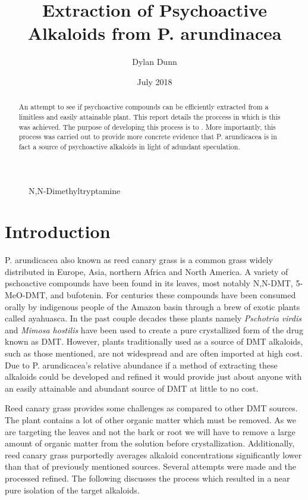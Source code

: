 \documentclass[12pt, a4paper]{article}
\title{Extraction of Psychoactive Alkaloids from P. arundinacea}
\author{Dylan Dunn}
\date{July 2018}
\begin{document}
\maketitle

\begin{abstract}
    An attempt to see if psychoactive compounds can be efficiently extracted from a limitless and easily attainable plant.
    This report details the proccess in which is this was achieved. The purpose of developing this process is to .
    More importantly, this process was carried out to provide more concrete evidence that P. arundicacea is in fact a source of psychoactive alkaloids in light of adundant speculation.
\end{abstract}

\begin{figure}[h]
\centering
{}
\caption{N,N-Dimethyltryptamine}
\end{figure}

\section{Introduction}
    P. arundicacea also known as reed canary grass is a common grass widely distributed in Europe, Asia, northern Africa and North America\cite{USDA15}.
    A variety of pschoactive compounds have been found in its leaves, most notably N,N-DMT, 5-MeO-DMT, and bufotenin\cite{Smith76}.
    For centuries these compounds have been consumed orally by indigenous people of the Amazon basin through a brew of exotic plants called ayahuasca.
    In the past couple decades these plants namely \emph{Pschotria virdis} and \emph{Mimosa hostilis} have been used to create a pure crystallized form of the drug known as DMT.
    However, plants traditionally used as a source of DMT alkaloids, such as those mentioned, are not widespread and are often imported at high cost.
    Due to P. arundicacea's relative abundance if a method of extracting these alkaloids could be developed and refined it would provide just about anyone with an easily attainable and abundant source of DMT at little to no cost. 
    
    Reed canary grass provides some challenges as compared to other DMT sources. The plant contains a lot of other organic matter which must be removed. 
    As we are targeting the leaves and not the bark or root we will have to remove a large amount of organic matter from the solution before crystallization.
    Additionally, reed canary grass purportedly averages alkaloid concentrations significantly lower than that of previously mentioned sources.   
    Several attempts were made and the processed refined. The following discusses the process which resulted in a near pure isolation of the target alkaloids.
\end{document}
